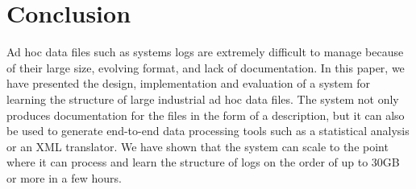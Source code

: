 \documentclass{acm_proc_article-sp}
\begin{document}















\section{Conclusion}
\label{sec:conclude}
Ad hoc data files such as systems logs 
are extremely difficult to manage because of their large size,
evolving format, and lack of documentation.
In this paper, we have presented the design, implementation and
evaluation of a system for learning the structure of 
large industrial ad hoc data files.  The system not only
produces documentation for the files in the form of a \pads{}
description, but it can also be used to generate end-to-end
data processing tools such as a statistical analysis or an
XML translator.  We have shown that the system
can scale to the point where it can process and learn the
structure of logs on the order of up to 30GB or more in 
a few hours.



\end{document}
